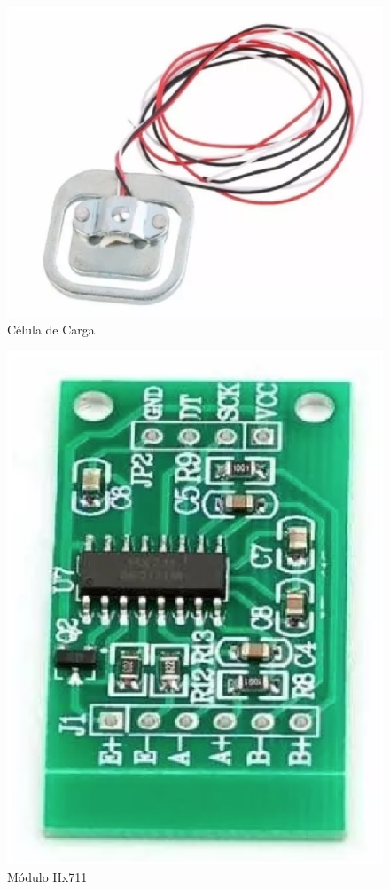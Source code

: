 \begin{figure}[H]
 \centering
   \includegraphics[keepaspectratio=true,scale=0.8]{figuras/celular_carga.eps}
 \caption{Célula de Carga}
 \label{celular_carga}
\end{figure}

\begin{figure}[H]
 \centering
   \includegraphics[keepaspectratio=true,scale=0.8]{figuras/modulo_h711.eps}
 \caption{Módulo Hx711}
 \label{modulo_h711}
\end{figure}

